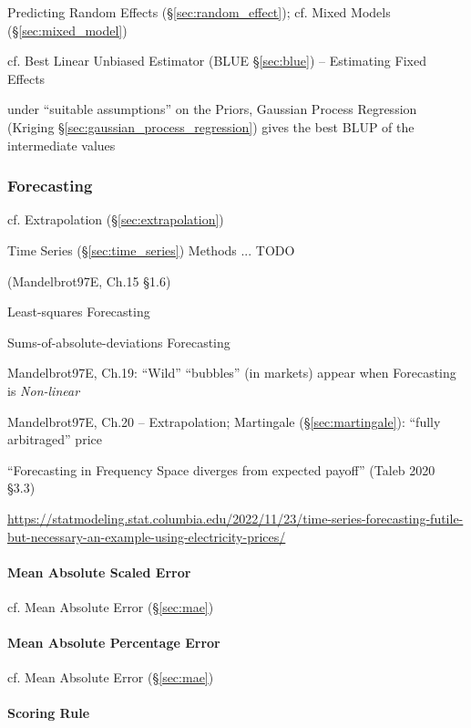 Predicting Random Effects (\S\ref{sec:random_effect});
cf. Mixed Models (\S\ref{sec:mixed_model})

cf. Best Linear Unbiased Estimator (BLUE \S\ref{sec:blue}) -- Estimating
Fixed Effects

under ``suitable assumptions'' on the Priors, Gaussian Process Regression
(Kriging \S\ref{sec:gaussian_process_regression}) gives the best BLUP of the
intermediate values



\subsubsection{Forecasting}\label{sec:forecasting}

cf. Extrapolation (\S\ref{sec:extrapolation})

Time Series (\S\ref{sec:time_series}) Methods ... TODO

(Mandelbrot97E, Ch.15 \S 1.6)

Least-squares Forecasting

Sums-of-absolute-deviations Forecasting

Mandelbrot97E, Ch.19: ``Wild'' ``bubbles'' (in markets) appear when Forecasting
is \emph{Non-linear}

Mandelbrot97E, Ch.20 -- Extrapolation; Martingale (\S\ref{sec:martingale}):
``fully arbitraged'' price

``Forecasting in Frequency Space diverges from expected payoff''
(Taleb 2020 \S 3.3)

\url{https://statmodeling.stat.columbia.edu/2022/11/23/time-series-forecasting-futile-but-necessary-an-example-using-electricity-prices/}



\paragraph{Mean Absolute Scaled Error}\label{sec:mase}\hfill

cf. Mean Absolute Error (\S\ref{sec:mae})



\paragraph{Mean Absolute Percentage Error}\label{sec:mape}\hfill

cf. Mean Absolute Error (\S\ref{sec:mae})



\paragraph{Scoring Rule}\label{sec:scoring_rule}\hfill

